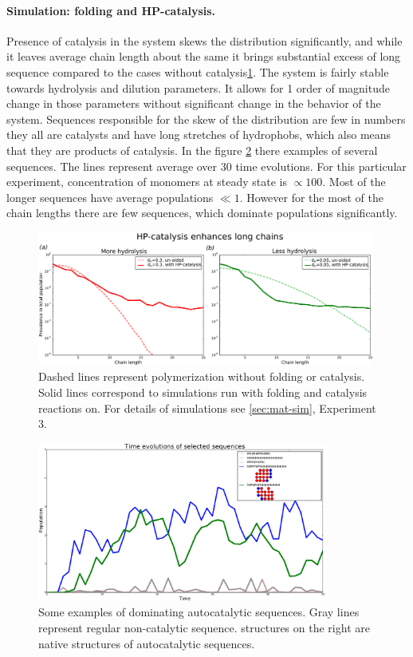 \documentclass[12pt]{paper}
\begin{document}
\paragraph{Simulation: folding and HP-catalysis.} Presence of catalysis in the system skews the 
distribution significantly, and while it leaves average chain length about the same it brings 
substantial excess of long sequence compared to the cases without catalysis\ref{fig:sim.flory-hp}. 
The system is fairly stable towards hydrolysis and dilution parameters. It allows for 1 order of 
magnitude change in those parameters without significant change in the behavior of the system. 
Sequences responsible for the skew of the distribution are few in numbers they all are catalysts 
and have long stretches of hydrophobs, which also means that they are products of catalysis. In 
the figure \ref{fig:example1} there examples of several sequences. The lines represent average 
over 30 time evolutions. For this particular experiment, concentration of monomers at steady 
state is $\propto 100$. Most of the longer sequences have average populations $\ll 1$. However for 
the most of the chain lengths there are few sequences, which dominate populations significantly.
\begin{figure}[h!]
  \centering
  \includegraphics[width=0.99\textwidth]{pictures/flory-and-hp.pdf} 
  \caption{Dashed lines represent polymerization without folding or catalysis. Solid lines 
correspond to simulations run with folding and catalysis reactions on. For details of simulations 
see \ref{sec:mat-sim}, Experiment 3. }
  \label{fig:sim.flory-hp}
\end{figure}

\begin{figure}[h!]
  \centering
  \includegraphics[width=0.85\textwidth]{pictures/example1.pdf} 
  \caption{Some examples of dominating autocatalytic sequences. Gray lines represent regular 
non-catalytic sequence. structures on the right are native structures of autocatalytic sequences. }
  \label{fig:example1}
\end{figure}
\end{document}
